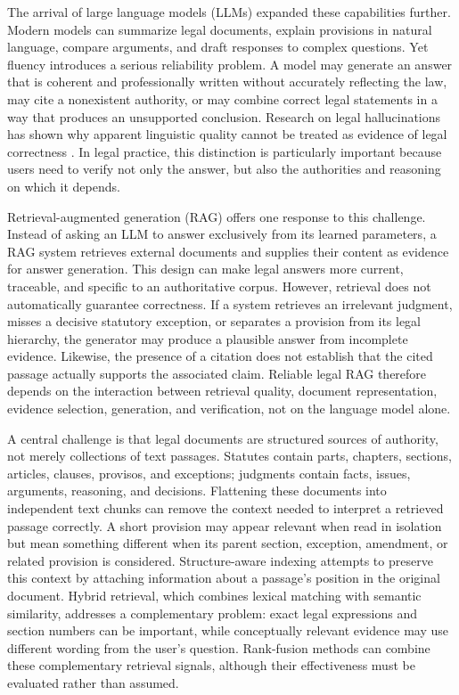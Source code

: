 The arrival of large language models (LLMs) expanded these capabilities further. Modern models can
summarize legal documents, explain provisions in natural language, compare arguments, and draft
responses to complex questions. Yet fluency introduces a serious reliability problem. A model may
generate an answer that is coherent and professionally written without accurately reflecting the
law, may cite a nonexistent authority, or may combine correct legal statements in a way that
produces an unsupported conclusion. Research on legal hallucinations has shown why apparent
linguistic quality cannot be treated as evidence of legal correctness \citep{dahl2024,
magesh2025}. In legal practice, this distinction is particularly important because users need to
verify not only the answer, but also the authorities and reasoning on which it depends.

Retrieval-augmented generation (RAG) offers one response to this challenge. Instead of asking an
LLM to answer exclusively from its learned parameters, a RAG system retrieves external documents
and supplies their content as evidence for answer generation. This design can make legal answers
more current, traceable, and specific to an authoritative corpus. However, retrieval does not
automatically guarantee correctness. If a system retrieves an irrelevant judgment, misses a
decisive statutory exception, or separates a provision from its legal hierarchy, the generator
may produce a plausible answer from incomplete evidence. Likewise, the presence of a citation
does not establish that the cited passage actually supports the associated claim. Reliable legal
RAG therefore depends on the interaction between retrieval quality, document representation,
evidence selection, generation, and verification, not on the language model alone.

A central challenge is that legal documents are structured sources of authority, not merely
collections of text passages. Statutes contain parts, chapters, sections, articles, clauses,
provisos, and exceptions; judgments contain facts, issues, arguments, reasoning, and decisions.
Flattening these documents into independent text chunks can remove the context needed to
interpret a retrieved passage correctly. A short provision may appear relevant when read in
isolation but mean something different when its parent section, exception, amendment, or related
provision is considered. Structure-aware indexing attempts to preserve this context by attaching
information about a passage's position in the original document. Hybrid retrieval, which combines
lexical matching with semantic similarity, addresses a complementary problem: exact legal
expressions and section numbers can be important, while conceptually relevant evidence may use
different wording from the user's question. Rank-fusion methods can combine these complementary
retrieval signals, although their effectiveness must be evaluated rather than assumed.

